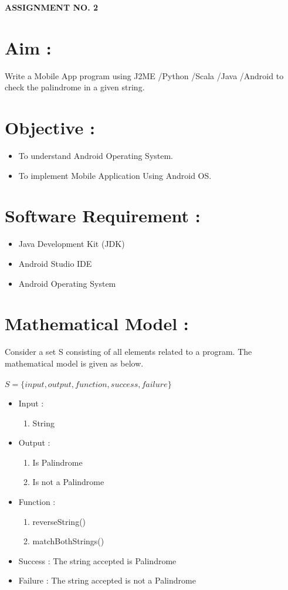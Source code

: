 \documentclass{article}
\begin{document}
\begin{center}
\textbf{\bfseries\Large ASSIGNMENT NO. 2}
\\[1cm]
\end{center}


\section{Aim : } 
	Write a Mobile App program using J2ME /Python /Scala /Java /Android to check the palindrome in a
given string.


\section{Objective : }  
	\begin{itemize}
		\item To understand Android Operating System.
		\item To implement Mobile Application Using Android OS.
	\end{itemize}

\section{Software Requirement : }  
	\begin{itemize}
    	\item Java Development Kit (JDK)
		\item Android Studio IDE
		\item Android Operating System
	\end{itemize}

\section{Mathematical Model : }  
	Consider a set S consisting of all elements related to a program. 
	The mathematical model is given as below.  \\  \\
    $S=\{input,output,function,success,failure\}$
	\begin{itemize}
		\item Input :
			\begin{enumerate}
				\item String
			\end{enumerate}
		\item Output :
        	\begin{enumerate}
				\item Is Palindrome
                \item Is not a Palindrome
			\end{enumerate}
		\item Function :
			\begin{enumerate}
				\item reverseString()
   				\item matchBothStrings()
			\end{enumerate}
		\item Success : The string accepted is Palindrome
        \item Failure : The string accepted is not a Palindrome
	\end{itemize}  
\end{document}
